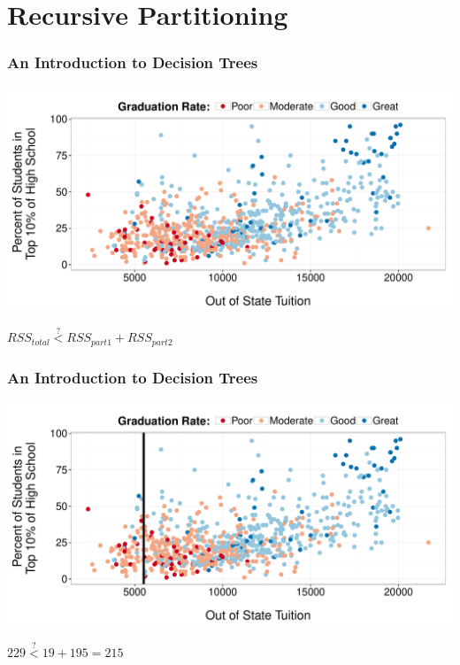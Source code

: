 \documentclass{beamer}\usepackage[]{graphicx}\usepackage[]{color}
\makeatletter
\def\maxwidth{ %
  \ifdim\Gin@nat@width>\linewidth
    \linewidth
  \else
    \Gin@nat@width
  \fi
}
\newenvironment{knitrout}{}{} %
\makeatother
\begin{document}

\section{Recursive Partitioning}
\begin{frame}
\frametitle{An Introduction to Decision Trees}

\begin{knitrout}
\color{fgcolor}
\includegraphics[width=\maxwidth]{figure/grad_rate-1} 

\end{knitrout}

\pause

\centering
$RSS_{total} \stackrel{?}{<} RSS_{part1} + RSS_{part2}$

\end{frame}


\begin{frame}
\frametitle{An Introduction to Decision Trees}

\begin{knitrout}
\color{fgcolor}
\includegraphics[width=\maxwidth]{figure/grad_rate_try_split-1} 

\end{knitrout}

\vspace{2ex}

\centering
$229 \stackrel{?}{<} 19 + 195 = 215$

\end{frame}
\end{document}
